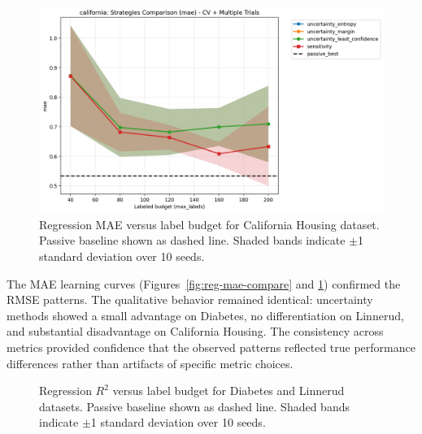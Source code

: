 \documentclass[conference]{IEEEtran}
\begin{document}
\begin{figure}[t]
\centering
\includegraphics[width=0.95\columnwidth]{figures/reg_california_comparison_mae.png}
\caption{Regression MAE versus label budget for California Housing dataset. Passive baseline shown as dashed line. Shaded bands indicate $\pm$1 standard deviation over 10 seeds.}
\label{fig:california-mae-compare}
\end{figure}

The MAE learning curves (Figures~\ref{fig:reg-mae-compare} and \ref{fig:california-mae-compare}) confirmed the RMSE patterns. The qualitative behavior remained identical: uncertainty methods showed a small advantage on Diabetes, no differentiation on Linnerud, and substantial disadvantage on California Housing. The consistency across metrics provided confidence that the observed patterns reflected true performance differences rather than artifacts of specific metric choices.

\begin{figure}[t]
\centering
{}
\hfill
{}
\caption{Regression $R^2$ versus label budget for Diabetes and Linnerud datasets. Passive baseline shown as dashed line. Shaded bands indicate $\pm$1 standard deviation over 10 seeds.}
\label{fig:reg-r2-compare}
\end{figure}
\end{document}

